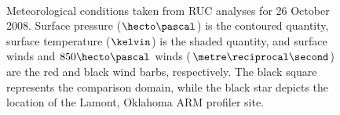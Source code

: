 \begin{figure}[H]
     \begin{center}
%
        \\ %
%
    \end{center}
    \caption{%
        Meteorological conditions taken from RUC analyses for 26 October 2008. Surface pressure ($\hecto\pascal$) is the contoured quantity, surface temperature ($\kelvin$) is the shaded quantity, and surface winds and $850\hecto\pascal$ winds ($\metre\reciprocal\second$) are the red and black wind barbs, respectively. The black square represents the comparison domain, while the black star depicts the location of the Lamont, Oklahoma ARM profiler site.}%
   \label{figure418}
\end{figure}


